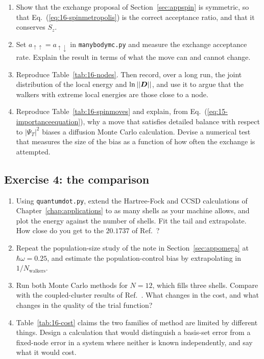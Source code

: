 \begin{enumerate}
\item[a)] Show that the exchange proposal of Section~\ref{sec:appspin} is
  symmetric, so that Eq.~(\ref{eq:16-spinmetropolis}) is the correct
  acceptance ratio, and that it conserves $S_z$.

\item[b)] Set $a_{\uparrow\uparrow}=a_{\uparrow\downarrow}$ in
  \texttt{manybodymc.py} and measure the exchange acceptance rate.  Explain the
  result in terms of what the move can and cannot change.

\item[c)] Reproduce Table~\ref{tab:16-nodes}.  Then record, over a long run,
  the joint distribution of the local energy and $\ln|{|\boldsymbol{D}|}|$, and use it to
  argue that the walkers with extreme local energies are those close to a node.

\item[d)] Reproduce Table~\ref{tab:16-spinmoves} and explain, from
  Eq.~(\ref{eq:15-importanceequation}), why a move that satisfies detailed
  balance with respect to $|\Psi_T|^2$ biases a diffusion Monte Carlo
  calculation.  Devise a numerical test that measures the size of the bias as a
  function of how often the exchange is attempted.
\end{enumerate}

\subsection*{Exercise 4: the comparison}
\label{ex:16-comparison}

\begin{enumerate}
\item[a)] Using \texttt{quantumdot.py}, extend the Hartree-Fock and CCSD
  calculations of Chapter~\ref{chap:applications} to as many shells as your
  machine allows, and plot the energy against the number of shells.  Fit the
  tail and extrapolate.  How close do you get to the $20.1737$ of
  Ref.~\cite{lohne2011}?

\item[b)] Repeat the population-size study of the note in
  Section~\ref{sec:appomega} at $\hbar\omega=0.25$, and estimate the
  population-control bias by extrapolating in
  $1/N_{\mathrm{walkers}}$.

\item[c)] Run both Monte Carlo methods for $N=12$, which fills three shells.
  Compare with the coupled-cluster results of Ref.~\cite{lohne2011}.  What
  changes in the cost, and what changes in the quality of the trial function?

\item[d)] Table~\ref{tab:16-cost} claims the two families of method are limited
  by different things.  Design a calculation that would distinguish a
  basis-set error from a fixed-node error in a system where neither is known
  independently, and say what it would cost.
\end{enumerate}
